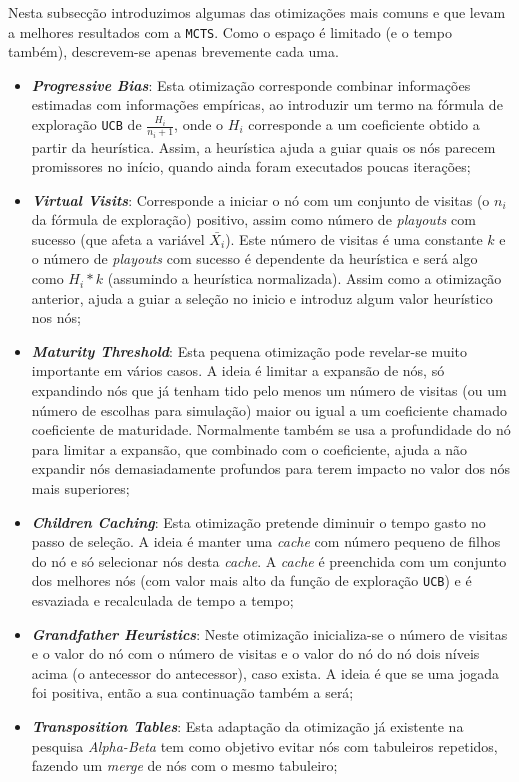 \documentclass[12pt,a4paper,oneside]{article}
\begin{document}
Nesta subsecção introduzimos algumas das otimizações mais comuns e que
levam a melhores resultados com a \texttt{MCTS}. Como o espaço é
limitado (e o tempo também), descrevem-se apenas brevemente cada uma.

\begin{itemize}
\item \textbf{\textit{Progressive Bias}}: Esta otimização corresponde
  combinar informações estimadas com informações empíricas, ao
  introduzir um termo na fórmula de exploração \texttt{UCB} de
  $\frac{H_i}{n_i + 1}$, onde o $H_i$ corresponde a um coeficiente
  obtido a partir da heurística. Assim, a heurística ajuda a guiar
  quais os nós parecem promissores no início, quando ainda foram
  executados poucas iterações;
\item \textbf{\textit{Virtual Visits}}: Corresponde a iniciar o nó com
  um conjunto de visitas (o $n_i$ da fórmula de exploração) positivo,
  assim como número de \textit{playouts} com sucesso (que afeta a
  variável $\bar{X_i}$). Este número de visitas é uma constante $k$ e
  o número de \textit{playouts} com sucesso é dependente da heurística
  e será algo como $H_i * k$ (assumindo a heurística
  normalizada). Assim como a otimização anterior, ajuda a guiar a
  seleção no inicio e introduz algum valor heurístico nos nós;
\item \textbf{\textit{Maturity Threshold}}: Esta pequena otimização
  pode revelar-se muito importante em vários casos. A ideia é limitar
  a expansão de nós, só expandindo nós que já tenham tido pelo menos
  um número de visitas (ou um número de escolhas para simulação) maior
  ou igual a um coeficiente chamado coeficiente de
  maturidade. Normalmente também se usa a profundidade do nó para
  limitar a expansão, que combinado com o coeficiente, ajuda a não
  expandir nós demasiadamente profundos para terem impacto no valor
  dos nós mais superiores;
\item \textbf{\textit{Children Caching}}: Esta otimização pretende
  diminuir o tempo gasto no passo de seleção. A ideia é manter uma
  \textit{cache} com número pequeno de filhos do nó e só selecionar
  nós desta \textit{cache}. A \textit{cache} é preenchida com um
  conjunto dos melhores nós (com valor mais alto da função de
  exploração \texttt{UCB}) e é esvaziada e recalculada de tempo a
  tempo;
\item \textbf{\textit{Grandfather Heuristics}}: Neste otimização
  inicializa-se o número de visitas e o valor do nó com o número de
  visitas e o valor do nó do nó dois níveis acima (o antecessor do
  antecessor), caso exista. A ideia é que se uma jogada foi positiva,
  então a sua continuação também a será;
\item \textbf{\textit{Transposition Tables}}: Esta adaptação da
  otimização já existente na pesquisa \textit{Alpha-Beta} tem como
  objetivo evitar nós com tabuleiros repetidos, fazendo um
  \textit{merge} de nós com o mesmo tabuleiro;
\end{itemize}
\end{document}
